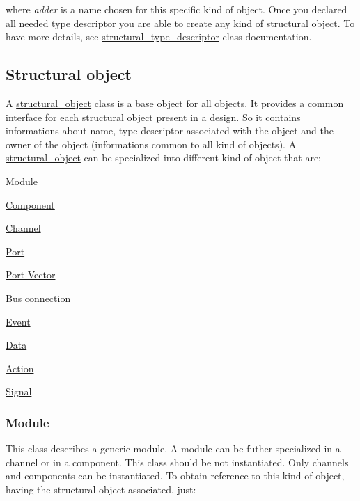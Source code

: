  where {\itshape adder} is a name chosen for this specific kind of object. Once you declared all needed type descriptor you are able to create any kind of structural object. To have more details, see \hyperlink{structstructural__type__descriptor}{structural\+\_\+type\+\_\+descriptor} class documentation.\hypertarget{src_circuit_page_structural_object_description}{}\subsection{Structural object}\label{src_circuit_page_structural_object_description}
A \hyperlink{classstructural__object}{structural\+\_\+object} class is a base object for all objects. It provides a common interface for each structural object present in a design. So it contains informations about name, type descriptor associated with the object and the owner of the object (informations common to all kind of objects). A \hyperlink{classstructural__object}{structural\+\_\+object} can be specialized into different kind of object that are\+:
\begin{DoxyItemize}
\item \hyperlink{src_circuit_page_s_o_module}{Module}
\item \hyperlink{src_circuit_page_s_o_component}{Component}
\item \hyperlink{src_circuit_page_s_o_channel}{Channel}
\item \hyperlink{src_circuit_page_s_o_port}{Port}
\item \hyperlink{src_circuit_page_s_o_portvector}{Port Vector}
\item \hyperlink{src_circuit_page_s_o_bus_connection}{Bus connection}
\item \hyperlink{src_circuit_page_s_o_event}{Event}
\item \hyperlink{src_circuit_page_s_o_data}{Data}
\item \hyperlink{src_circuit_page_s_o_action}{Action}
\item \hyperlink{src_circuit_page_s_o_signal}{Signal}
\end{DoxyItemize}\hypertarget{src_circuit_page_s_o_module}{}\subsubsection{Module}\label{src_circuit_page_s_o_module}
This class describes a generic module. A module can be futher specialized in a channel or in a component. This class should be not instantiated. Only channels and components can be instantiated. To obtain reference to this kind of object, having the structural object associated, just\+: 
